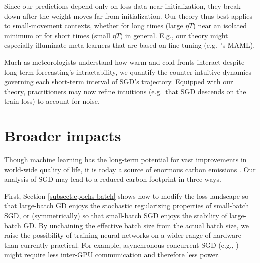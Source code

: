 \documentclass{article}
\theoremstyle{plain}
\theoremstyle{definition}
\begin{document}


        Since our predictions depend only on loss data near initialization,
        they break down after the weight moves far from initialization.  Our
        theory thus best applies to small-movement contexts, whether for long
        times (large $\eta T$) near an isolated minimum or for short times
        (small $\eta T$) in general.  E.g., our theory might especially
        illuminate meta-learners that are based on fine-tuning (e.g.\
        \cite{fi17}'s MAML).

        Much as meteorologists understand how warm and cold fronts interact
        despite long-term forecasting's intractability, we quantify the
        counter-intuitive dynamics governing each short-term interval of SGD's
        trajectory.  Equipped with our theory, practitioners may now
        refine intuitions (e.g.\ that SGD descends on the train loss) to
        account for noise.
       


\section*{Broader impacts}

    Though machine learning has the long-term potential for vast improvements
    in world-wide quality of life, it is today a source of enormous carbon
    emissions \citep{st19}.  Our analysis of SGD may lead to a reduced carbon
    footprint in three ways. 
     
    First, Section \ref{subsect:epochs-batch} shows how to modify the loss
    landscape so that large-batch GD enjoys the stochastic regularizing
    properties of small-batch SGD, or (symmetrically) so that small-batch SGD
    enjoys the stability of large-batch GD.  By unchaining the effective batch
    size from the actual batch size, we raise the possibility of training
    neural networks on a wider range of hardware than currently practical.  For
    example, asynchronous concurrent SGD (e.g., \cite{ni11}) might
    require less inter-GPU communication and therefore less power.
     
\end{document}
